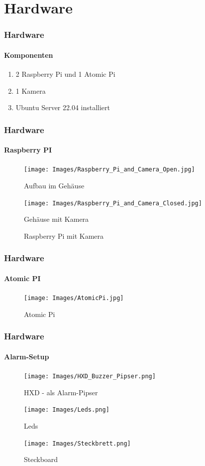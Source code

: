 \documentclass[aspectratio=169]{beamer}
\begin{document}
\section{Hardware}

\begin{frame}
	\frametitle{Hardware}
	\framesubtitle{Komponenten}
	\begin{enumerate}
		\item 2  Raspberry Pi und 1 Atomic Pi
		\item 1 Kamera
		\item Ubuntu Server 22.04 installiert
	\end{enumerate}
\end{frame}

\begin{frame}
	\frametitle{Hardware}
	\framesubtitle{Raspberry PI}
	\begin{figure}
		\centering
		\begin{minipage}[t]{0.45\textwidth}
			\centering
			\texttt{[image: Images/Raspberry\_Pi\_and\_Camera\_Open.jpg]}
			\caption*{Aufbau im Gehäuse}
		\end{minipage}
		\hfill
		\begin{minipage}[t]{0.45\textwidth}
			\centering
			\texttt{[image: Images/Raspberry\_Pi\_and\_Camera\_Closed.jpg]}
			\caption*{Gehäuse mit Kamera}
		\end{minipage}
		\hfill
		\caption{Raspberry Pi mit Kamera}
		\label{fig:Raspberry PI}
	\end{figure}
\end{frame}

\begin{frame}
	\frametitle{Hardware}
	\framesubtitle{Atomic PI}
	\begin{figure}
		\centering
		\begin{minipage}[t]{1\textwidth}
			\centering
			\texttt{[image: Images/AtomicPi.jpg]}
		\end{minipage}
		\caption{Atomic Pi}
		\label{fig:Atomic Pi}
	\end{figure}
\end{frame}

\begin{frame}
	\frametitle{Hardware}
	\framesubtitle{Alarm-Setup}
	\begin{figure}
		\centering
		\begin{minipage}{0.32\textwidth}
			\centering
			\texttt{[image: Images/HXD\_Buzzer\_Pipser.png]} 
			\caption{HXD - als Alarm-Pipser}
		\end{minipage}\hfill
		\begin{minipage}{0.32\textwidth}
			\centering
			\texttt{[image: Images/Leds.png]} 
			\caption{Leds}
		\end{minipage}\hfill
		\begin{minipage}{0.32\textwidth}
			\centering
			\texttt{[image: Images/Steckbrett.png]}
			\caption{Steckboard}
		\end{minipage}
	\end{figure}
\end{frame}
\end{document}
